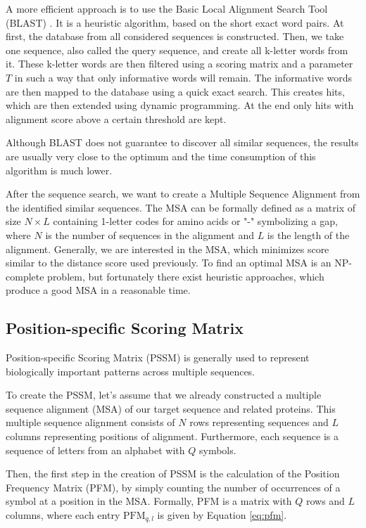 A more efficient approach is to use the Basic Local Alignment Search Tool (BLAST) \cite{altschul1990basic}.
It is a heuristic algorithm, based on the short exact word pairs.
At first, the database from all considered sequences is constructed.
Then, we take one sequence, also called the query sequence, and create all k-letter words from it.
These k-letter words are then filtered using a scoring matrix and a parameter $T$ in such a way that only informative words will remain.
The informative words are then mapped to the database using a quick exact search.
This creates hits, which are then extended using dynamic programming.
At the end only hits with alignment score above a certain threshold are kept.

Although BLAST does not guarantee to discover all similar sequences, the results are usually very close to the optimum and the time consumption of this algorithm is much lower.

After the sequence search, we want to create a Multiple Sequence Alignment from the identified similar sequences.
The MSA can be formally defined as a matrix of size $N \times L$ containing 1-letter codes for amino acids or "-" symbolizing a gap, where $N$ is the number of sequences in the alignment and $L$ is the length of the alignment.
Generally, we are interested in the MSA, which minimizes score similar to the distance score used previously.
To find an optimal MSA is an NP-complete problem, but fortunately there exist heuristic approaches, which produce a good MSA in a reasonable time. 

\subsection{Position-specific Scoring Matrix}

Position-specific Scoring Matrix (PSSM) is generally used to represent biologically important patterns across multiple sequences. 

To create the PSSM, let's assume that we already constructed a multiple sequence alignment (MSA) of our target sequence and related proteins.
This multiple sequence alignment consists of $N$ rows representing sequences and $L$ columns representing positions of alignment.
Furthermore, each sequence is a sequence of letters from an alphabet with $Q$ symbols.

Then, the first step in the creation of PSSM is the calculation of the Position Frequency Matrix (PFM), by simply counting the number of occurrences of a symbol at a position in the MSA.
Formally, PFM is a matrix with $Q$ rows and $L$ columns, where each entry $\text{PFM}_{q, l}$ is given by Equation \ref{eq:pfm}.

